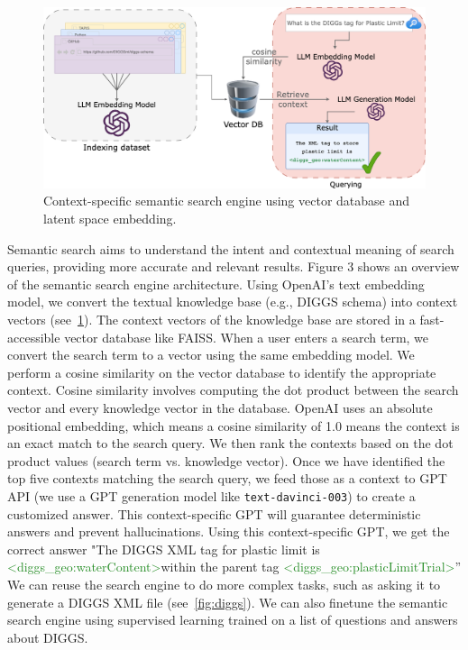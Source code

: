 \documentclass{article}
\begin{document}
\begin{figure}[ht]
    \centering
    \includegraphics[width = 0.8\linewidth]{figs/semantic-search.png}
    \caption{Context-specific semantic search engine using vector database and latent space embedding.
    \label{fig:semantic-search}
}
\end{figure}
Semantic search aims to understand the intent and contextual meaning of search queries, providing more accurate and relevant results. Figure 3 shows an overview of the semantic search engine architecture. Using OpenAI's text embedding model, we convert the textual knowledge base (e.g., DIGGS schema) into context vectors (see~\cref{fig:semantic-search}). The context vectors of the knowledge base are stored in a fast-accessible vector database like FAISS. When a user enters a search term, we convert the search term to a vector using the same embedding model. We perform a cosine similarity on the vector database to identify the appropriate context. Cosine similarity involves computing the dot product between the search vector and every knowledge vector in the database. OpenAI uses an absolute positional embedding, which means a cosine similarity of 1.0 means the context is an exact match to the search query. We then rank the contexts based on the dot product values (search term vs. knowledge vector). Once we have identified the top five contexts matching the search query, we feed those as a context to GPT API (we use a GPT generation model like \verb|text-davinci-003|) to create a customized answer. This context-specific GPT will guarantee deterministic answers and prevent hallucinations. Using this context-specific GPT, we get the correct answer "The DIGGS XML tag for plastic limit is \textcolor{ForestGreen}{\textless diggs\_geo:waterContent\textgreater}within the parent tag \textcolor{ForestGreen}{\textless diggs\_geo:plasticLimitTrial\textgreater}” We can reuse the search engine to do more complex tasks, such as asking it to generate a DIGGS XML file (see~\cref{fig:diggs}). We can also finetune the semantic search engine using supervised learning trained on a list of questions and answers about DIGGS. 
\end{document}
